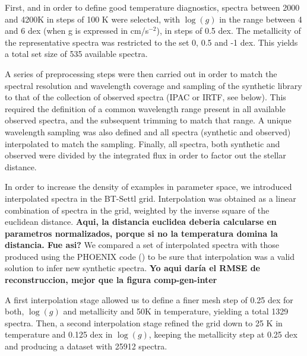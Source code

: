 { First, and in order to define good temperature diagnostics, spectra
between 2000 and 4200K in steps of 100 K were selected, with $\log(g)$
in the range between 4 and 6 dex (when g is expressed in cm/s$^{-2}$),
in steps of 0.5 dex. The metallicity of the representative spectra was
restricted to the set 0, 0.5 and -1 dex.  This yields a total set
size of 535 available spectra.

{A series of preprocessing steps were then carried out in order to
match the spectral resolution and wavelength coverage and sampling of
the synthetic library to that of the collection of observed spectra
(IPAC or IRTF, see below). This required the definition of a common
wavelength range present in all available observed spectra, and the
subsequent trimming to match that range. A unique wavelength sampling
was also defined and all spectra (synthetic and observed) interpolated
to match the sampling. Finally, all spectra, both synthetic and
observed were divided by the integrated flux in order to factor out
the stellar distance.}

{ In order to increase the density of examples in parameter space, we
  introduced interpolated spectra in the BT-Settl grid. Interpolation
  was obtained as a linear combination of spectra in the grid,
  weighted by the inverse square of the euclidean distance. {\bf Aqui,
  la distancia euclidea deberia calcularse en parametros normalizados,
  porque si no la temperatura domina la distancia. Fue asi?} We
  compared a set of interpolated spectra with those produced using the
  PHOENIX code (\cite{fuhrmeister2005phoenix}) to be sure that
  interpolation was a valid solution to infer new synthetic
  spectra. {\bf Yo aqui daría el RMSE de reconstruccion, mejor que la
  figura comp-gen-inter}



{ A first interpolation stage allowed us to define a finer mesh step of
0.25 dex for both, $\log(g)$ and metallicity and 50K in temperature,
yielding a total 1329 spectra.  Then, a second interpolation stage
refined the grid down to 25 K in temperature and 0.125 dex in 
$\log(g)$, keeping the metallicity step at 0.25 dex and producing a
dataset with 25912 spectra.}

}}

